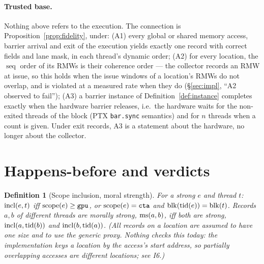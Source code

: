 \documentclass[11pt]{article}
\newtheorem{definition}[theorem]{Definition}
\theoremstyle{remark}
\DeclareMathOperator{\tid}{tid}\DeclareMathOperator{\pc}{pc}\DeclareMathOperator{\seq}{seq}
\begin{document}
\paragraph{Trusted base.} Nothing above refers to the execution. The connection is
Proposition~\ref{prop:fidelity}, under: (A1) every global or shared memory access, barrier
arrival and exit of the execution yields exactly one record with correct fields and lane
mask, in each thread's dynamic order; (A2) for every location, the $\seq$ order of its
RMWs is their coherence order --- the collector records an RMW at issue, so this holds
when the issue windows of a location's RMWs do not overlap, and is violated at a measured
rate when they do (\S\ref{sec:impl}, ``A2 observed to fail''); (A3) a barrier instance of Definition~\ref{def:instance} completes exactly
when the hardware barrier releases, i.e.\ the hardware waits for the non-exited threads
of the block (PTX \texttt{bar.sync} semantics) and for $n$ threads when a count is given.
Under exit records, A3 is a statement about the hardware, no longer about the collector.

\section{Happens-before and verdicts}\label{sec:hb}

\begin{definition}[Scope inclusion, moral strength]\label{def:ms}
For a strong $e$ and thread $t$: $\operatorname{incl}(e,t)$ iff $\operatorname{scope}(e)\ge\mathtt{gpu}$, or
$\operatorname{scope}(e)=\mathtt{cta}$ and $\blk(\tid(e))=\blk(t)$. Records $a,b$ of different threads
are \emph{morally strong}, $\operatorname{ms}(a,b)$, iff both are strong, $\incl(a,\tid(b))$ and
$\incl(b,\tid(a))$. (All records on a location are assumed to have one size and to use the
generic proxy. Nothing checks this today: the implementation keys a location by the access's
start address, so partially overlapping accesses are different locations; see I6.)
\end{definition}
\end{document}
